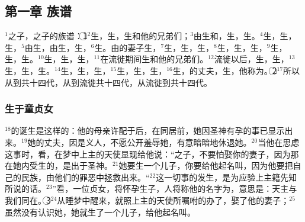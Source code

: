 \subsection{第一章 族谱}
$^{1}$\UL[亚巴郎]之子，\UL[达味]之子\UL[耶稣]\UL[基督]的族谱：\textcircled{1}$^{2}$\UL[亚巴郎]生\UL[依撒格]，\UL[依撒格]生\UL[雅各伯]，\UL[雅各伯]生\UL[犹大]和他的兄弟们；$^{3}$\UL[犹大]由\UL[塔玛尔]生\UL[培勒兹]和\UL[则辣黑]，\UL[培勒兹]生\UL[赫兹龙]，\UL[赫兹龙]生\UL[阿兰]。$^{4}$\UL[阿兰]生\UL[阿米纳达布]，\UL[阿米纳达布]生\UL[纳赫雄]，\UL[纳赫雄]生\UL[撒耳孟]，$^{5}$\UL[撒耳孟]由\UL[辣哈布]生\UL[波阿次]，\UL[波阿次]由\UL[卢德]生\UL[敖贝得]，\UL[傲贝得]生\UL[叶瑟]，$^{6}$\UL[叶瑟]生\UL[达味王]。\UL[达味]由\UL[乌黎雅]的妻子生\UL[撒罗满]，$^{7}$\UL[撒罗满]生\UL[勒哈贝罕]，\UL[勒哈贝罕]生\UL[阿彼雅]，\UL[阿彼雅]生\UL[阿撒]，$^{8}$\UL[阿撒]生\UL[约沙法特]，\UL[约沙法特]生\UL[约兰]，\UL[约兰]生\UL[乌齐雅]，$^{9}$\UL[乌齐雅]生\UL[约堂]，\UL[约堂]生\UL[阿哈次]，\UL[阿哈次]生\UL[希则克雅]。$^{10}$\UL[希则克雅]生\UL[默纳舍]，\UL[默纳舍]生\UL[阿孟]，\UL[阿孟]生\UL[约史雅]，$^{11}$\UL[约史雅]在\UL[巴比伦]流徙期间生\UL[耶苛尼雅]和他的兄弟们。$^{12}$流徙\UL[巴比伦]以后，\UL[耶苛尼雅]生\UL[沙耳提耳]，\UL[沙耳提耳]生\UL[则鲁巴贝耳]，$^{13}$\UL[则鲁巴贝耳]生\UL[阿彼乌得]，\UL[阿彼乌得]生\UL[厄里雅金]，\UL[厄里雅金]生\UL[阿左尔]。$^{14}$\UL[阿左尔]生\UL[匝多克]，\UL[匝多克]生\UL[阿歆]，\UL[阿歆]生\UL[厄里乌得]，$^{15}$\UL[厄里乌得]生\UL[厄肋阿匝尔]，\UL[厄肋阿匝尔]生\UL[玛堂]，\UL[玛堂]生\UL[雅各伯]，$^{16}$\UL[雅各伯]生\UL[若瑟]，\UL[玛利亚]的丈夫，\UL[玛利亚]生\UL[耶稣]，他称为\UL[基督]。\textcircled{2}$^{17}$所以从\UL[亚巴郎]到\UL[达味]共十四代，从\UL[达味]到流徙\UL[巴比伦]共十四代，从流{徙}\UL[巴比伦]到\UL[基督]共十四代。


\subsubsection{生于童贞女}
$^{18}$\UL[耶稣]\UL[基督]的诞生是这样的：他的母亲\UL[玛利亚]许配于\UL[若瑟]后，在同居前，她因圣神有孕的事已显示出来。$^{19}$她的丈夫\UL[若瑟]，因是义人，不愿公开羞辱她，有意暗暗地休退她。$^{20}$当他在思虑这事时，看，在梦中上主的天使显现给他说：“\UL[达味]之子\UL[若瑟]，不要怕娶你的妻子\UL[玛利亚]，因为那在她内受生的，是出于圣神。$^{21}$她要生一个儿子，你要给他起名叫\UL[耶稣]，因为他要把自己的民族，由他们的罪恶中拯救出来。“$^{22}$这一切事的发生，是为应验上主籍先知所说的话。$^{23}$”看，一位贞女，将怀孕生子，人将称他的名字为\UL[厄玛奴耳]，意思是：天主与我们同在。\textcircled{3}$^{24}$\UL[若瑟]从睡梦中醒来，就照上主的天使所嘱咐的办了，娶了他的妻子；$^{25}$\UL[若瑟]虽然没有认识她，她就生了一个儿子，给他起名叫\UL[耶稣]。


